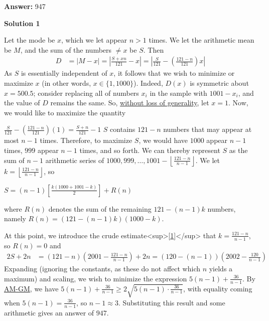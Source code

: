 \begin{enumerate}
 
 \textbf{Answer: }947



\textbf{Solution 1}

Let the mode be $x$, which we let appear $n > 1$ times. We let the arithmetic mean be $M$, and the sum of the numbers $\neq x$ be $S$. Then 
 \begin{align*} D &= \left|M-x\right| = \left|\frac{S+xn}{121}-x\right| = \left|\frac{S}{121}-\left(\frac{121-n}{121}\right)x\right| \end{align*}
As $S$ is essentially independent of $x$, it follows that we wish to minimize or maximize $x$ (in other words, $x \in \{1,1000\}$). Indeed, $D(x)$ is symmetric about $x = 500.5$; consider replacing all of numbers $x_i$ in the sample with $1001-x_i$, and the value of $D$ remains the same. So, \href{https://artofproblemsolving.com/wiki/index.php?title=Without\_loss\_of\_generality}{without loss of generality}, let $x=1$. Now, we would like to maximize the quantity 

 $\frac{S}{121}-\left(\frac{121-n}{121}\right)(1) = \frac{S+n}{121}-1$
$S$ contains $121-n$ numbers that may appear at most $n-1$ times. Therefore, to maximize $S$, we would have $1000$ appear $n-1$ times, $999$ appear $n-1$ times, and so forth. We can thereby represent $S$ as the sum of $n-1$ arithmetic series of $1000, 999, \ldots, 1001 - \left\lfloor \frac{121-n}{n-1} \right\rfloor$. We let $k = \left\lfloor \frac{121-n}{n-1} \right\rfloor$, so

 $S = (n-1)\left[\frac{k(1000 + 1001 - k)}{2}\right] + R(n)$

 where $R(n)$ denotes the sum of the remaining $121-(n-1)k$ numbers, namely $R(n) = (121-(n-1)k)(1000-k)$. 

 At this point, we introduce the crude estimate<sup>[\href{https://artofproblemsolving.com\#note\_1}{1}]</sup> that $k=\frac{121-n}{n-1}$, so $R(n) = 0$ and
 \begin{align*}2S+2n &= (121-n)\left(2001-\frac{121-n}{n-1}\right)+2n = (120-(n-1))\left(2002-\frac{120}{n-1}\right)\end{align*}
Expanding (ignoring the constants, as these do not affect which $n$ yields a maximum) and scaling, we wish to minimize the expression $5(n-1) + \frac{36}{n-1}$. By \href{https://artofproblemsolving.com/wiki/index.php?title=AM-GM}{AM-GM}, we have $5(n-1) + \frac{36}{n-1} \ge 2\sqrt{5(n-1) \cdot \frac{36}{n-1}}$, with equality coming when $5(n-1) = \frac{36}{n-1}$, so $n-1 \approx 3$. Substituting this result and some arithmetic gives an answer of $\boxed{947}$.


\end{enumerate}
